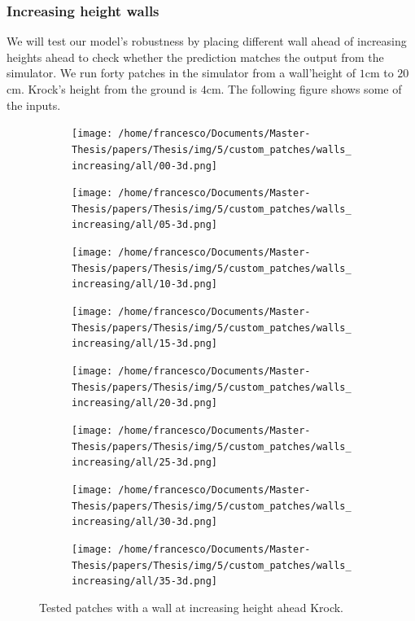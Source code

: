 \documentclass[../document.tex]{subfiles}
\begin{document}
\subsubsection{Increasing height walls}
We will test our model's robustness by placing different wall ahead of increasing heights ahead to check whether the prediction matches the output from the simulator. We run forty patches in the simulator from a wall'height of $1$cm to $20$cm. Krock's height from the ground is $4$cm. The following figure shows some of the inputs.

\begin{figure}[H]
    \centering
    \begin{subfigure}[b]{0.160\textwidth}
    \texttt{[image: /home/francesco/Documents/Master-Thesis/papers/Thesis/img/5/custom\_patches/walls\_increasing/all/00-3d.png]}
    \end{subfigure}
    \begin{subfigure}[b]{0.160\textwidth}
    \texttt{[image: /home/francesco/Documents/Master-Thesis/papers/Thesis/img/5/custom\_patches/walls\_increasing/all/05-3d.png]}
    \end{subfigure}
    \begin{subfigure}[b]{0.160\textwidth}
    \texttt{[image: /home/francesco/Documents/Master-Thesis/papers/Thesis/img/5/custom\_patches/walls\_increasing/all/10-3d.png]}
    \end{subfigure}
    \begin{subfigure}[b]{0.160\textwidth}
    \texttt{[image: /home/francesco/Documents/Master-Thesis/papers/Thesis/img/5/custom\_patches/walls\_increasing/all/15-3d.png]}
    \end{subfigure}
    \begin{subfigure}[b]{0.160\textwidth}
    \texttt{[image: /home/francesco/Documents/Master-Thesis/papers/Thesis/img/5/custom\_patches/walls\_increasing/all/20-3d.png]}
    \end{subfigure}
    \begin{subfigure}[b]{0.160\textwidth}
    \texttt{[image: /home/francesco/Documents/Master-Thesis/papers/Thesis/img/5/custom\_patches/walls\_increasing/all/25-3d.png]}
    \end{subfigure}
    \begin{subfigure}[b]{0.160\textwidth}
    \texttt{[image: /home/francesco/Documents/Master-Thesis/papers/Thesis/img/5/custom\_patches/walls\_increasing/all/30-3d.png]}
    \end{subfigure}
    \begin{subfigure}[b]{0.160\textwidth}
    \texttt{[image: /home/francesco/Documents/Master-Thesis/papers/Thesis/img/5/custom\_patches/walls\_increasing/all/35-3d.png]}
    \end{subfigure}
    \caption{Tested patches with a wall at increasing height ahead Krock.}
    \end{figure}
\end{document}
